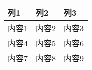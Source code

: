 \documentclass{article}
\begin{document}
\begin{longtable}{@{\kern\tabcolsep}p{4cm}p{4cm}p{4cm}@{\kern\tabcolsep}}
\toprule
\textbf{列1} & \textbf{列2} & \textbf{列3} \\ 
\midrule
内容1 & 内容2 & 内容3 \\
内容4 & 内容5 & 内容6 \\ 
内容7 & 内容8 & 内容9 \\ 
\bottomrule
\end{longtable}
\end{document}
